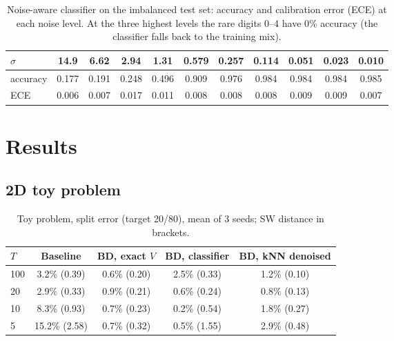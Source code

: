 \documentclass[twoside,english]{article}
\begin{document}
\begin{table}[h]\centering\small
\caption{Noise-aware classifier on the imbalanced test set: accuracy and calibration error (ECE) at each noise level.
At the three highest levels the rare digits 0--4 have 0\% accuracy (the classifier falls back to the training mix).}\label{tab:noisyclf}
\begin{tabular}{lcccccccccc}\toprule
$\sigma$ & 14.9 & 6.62 & 2.94 & 1.31 & 0.579 & 0.257 & 0.114 & 0.051 & 0.023 & 0.010 \\\midrule
accuracy & 0.177 & 0.191 & 0.248 & 0.496 & 0.909 & 0.976 & 0.984 & 0.984 & 0.984 & 0.985 \\
ECE & 0.006 & 0.007 & 0.017 & 0.011 & 0.008 & 0.008 & 0.008 & 0.009 & 0.009 & 0.007 \\\bottomrule
\end{tabular}
\end{table}

\section{Results}\label{sec:results}

\subsection{2D toy problem}
\begin{table}[h]\centering\small
\caption{Toy problem, split error (target 20/80), mean of 3 seeds; SW distance in brackets.}\label{tab:toy}
\begin{tabular}{lcccc}\toprule
$T$ & Baseline & BD, exact $V$ & BD, classifier & BD, kNN denoised \\\midrule
100 & 3.2\% (0.39) & 0.6\% (0.20) & 2.5\% (0.33) & 1.2\% (0.10) \\
20 & 2.9\% (0.33) & 0.9\% (0.21) & 0.6\% (0.24) & 0.8\% (0.13) \\
10 & 8.3\% (0.93) & 0.7\% (0.23) & 0.2\% (0.54) & 1.8\% (0.27) \\
5 & 15.2\% (2.58) & 0.7\% (0.32) & 0.5\% (1.55) & 2.9\% (0.48) \\\bottomrule
\end{tabular}
\end{table}
\end{document}
